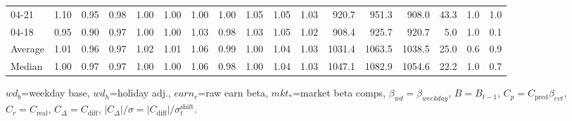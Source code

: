 \begin{threeparttable}
{\begin{tabular}{lrrrrrrrrrrrrrrrr}
  04-21 &   1.10 &   0.95 &         0.98 &     1.00 &           1.00 &        1.00 &        1.00 &        1.05 &          1.05 &          1.03 &  920.7 &  951.3 &  908.0 &       43.3 &                      1.0 &                 1.0 \\
  04-18 &   0.95 &   0.90 &         0.97 &     1.00 &           1.00 &        1.03 &        0.98 &        1.03 &          1.05 &          1.02 &  908.4 &  925.7 &  920.7 &        5.0 &                      1.0 &                 0.1 \\
Average &   1.01 &   0.96 &         0.97 &     1.02 &           1.01 &        1.06 &        0.99 &        1.00 &          1.04 &          1.03 & 1031.4 & 1063.5 & 1038.5 &       25.0 &                      0.6 &                 0.9 \\
 Median &   1.00 &   0.97 &         0.97 &     1.00 &           1.00 &        1.06 &        0.98 &        1.00 &          1.04 &          1.03 & 1047.1 & 1082.9 & 1054.6 &       22.2 &                      1.0 &                 0.7 \\
\bottomrule
\end{tabular}
}
\begin{tablenotes}\footnotesize
\item $wd_b$=weekday base, $wd_h$=holiday adj.,
$earn_r$=raw earn beta, $mkt_{*}$=market beta comps,
$\beta_{wd}=\beta_{weekday}$, $B=B_{t-1}$,
$C_p=C_{\text{pred}}\beta_{evt}$, $C_r=C_{\text{real}}$,
$C_\Delta=C_{\text{diff}}$, $|C_\Delta|/\sigma=|C_{\text{diff}}|/\sigma_t^{\text{shift}}$.
\end{tablenotes}
\end{threeparttable}
\endgroup
